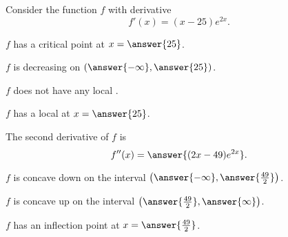 \documentclass{ximera}
\author{Nela Lakos \and Kyle Parsons}
\begin{document}
\begin{exercise}

Consider the function $f$ with derivative
\[
f'(x) = (x-25)e^{2x}.
\]

$f$ has a critical point at $x=\answer{25}$.

$f$ is decreasing on $\left(\answer{-\infty},\answer{25}\right)$.

$f$ does not have any local .

$f$ has a local  at $x=\answer{25}$.

The second derivative of $f$ is
\[
f''(x) = \answer{(2x-49)e^{2x}}.
\]

$f$ is concave down on the interval $\left(\answer{-\infty},\answer{\frac{49}{2}}\right)$.

$f$ is concave up on the interval $\left(\answer{\frac{49}{2}},\answer{\infty}\right)$.

$f$ has an inflection point at $x=\answer{\frac{49}{2}}$.



\end{exercise}
\end{document}
